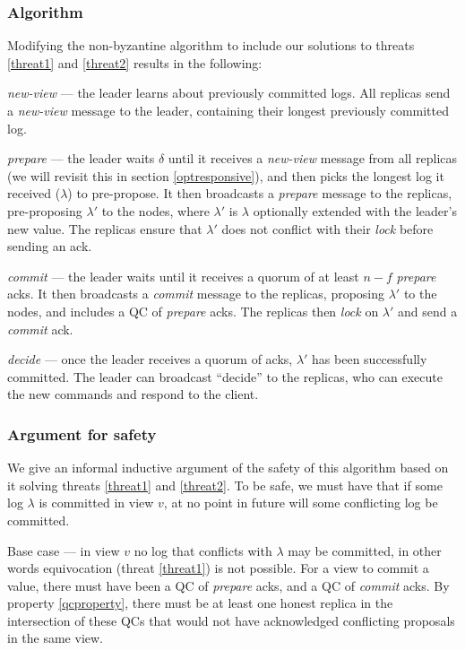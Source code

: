 \subsubsection{Algorithm}
Modifying the non-byzantine algorithm to include our solutions to threats \ref{threat1} and \ref{threat2} results in the following:

\textit{new-view} --- the leader learns about previously committed logs. All replicas send a \textit{new-view} message to the leader, containing their longest previously committed log.

\textit{prepare} --- the leader waits $\delta$ until it receives a \textit{new-view} message from all replicas (we will revisit this in section \ref{optresponsive}), and then picks the longest log it received ($\lambda$) to pre-propose. It then broadcasts a \textit{prepare} message to the replicas, pre-proposing $\lambda'$ to the nodes, where $\lambda'$ is $\lambda$ optionally extended with the leader's new value. The replicas ensure that $\lambda'$ does not conflict with their \textit{lock} before sending an ack.

\textit{commit} --- the leader waits until it receives a quorum of at least $n - f$ \textit{prepare} acks. It then broadcasts a \textit{commit} message to the replicas, proposing $\lambda'$ to the nodes, and includes a QC of \textit{prepare} acks. The replicas then \textit{lock} on $\lambda'$ and send a \textit{commit} ack.

\textit{decide} --- once the leader receives a quorum of acks, $\lambda'$ has been successfully committed. The leader can broadcast ``decide'' to the replicas, who can execute the new commands and respond to the client.

\subsubsection{Argument for safety}
We give an informal inductive argument of the safety of this algorithm based on it solving threats \ref{threat1} and \ref{threat2}. To be safe, we must have that if some log $\lambda$ is committed in view $v$, at no point in future will some conflicting log be committed.

Base case --- in view $v$ no log that conflicts with $\lambda$ may be committed, in other words equivocation (threat \ref{threat1}) is not possible. For a view to commit a value, there must have been a QC of \textit{prepare} acks, and a QC of \textit{commit} acks. By property \ref{qcproperty}, there must be at least one honest replica in the intersection of these QCs that would not have acknowledged conflicting proposals in the same view.

